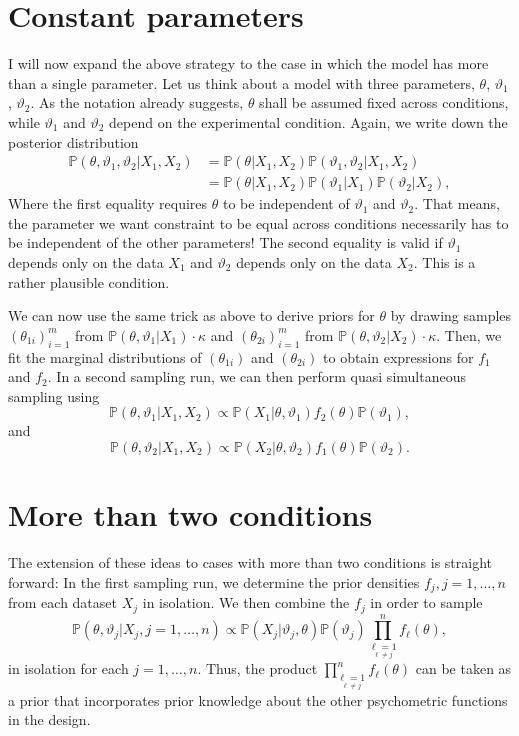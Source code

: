 \documentclass[a4paper,11pt]{scrartcl}
\def\prob{\mathbb{P}}
\begin{document}
\section{Constant parameters}

I will now expand the above strategy to the case in which the model has more than a single parameter.
Let us think about a model with three parameters, $\theta$, $\vartheta_1$, $\vartheta_2$.
As the notation already suggests,  $\theta$ shall be assumed fixed across conditions, while $\vartheta_1$ and $\vartheta_2$ depend on the
experimental condition.
Again, we write down the posterior distribution
%
\begin{align*}
\prob(\theta,\vartheta_1,\vartheta_2|X_1,X_2) &=\prob(\theta|X_1,X_2)\prob(\vartheta_1,\vartheta_2|X_1,X_2)\\
&= \prob(\theta|X_1,X_2)\prob(\vartheta_1|X_1)\prob(\vartheta_2|X_2),
\end{align*}
%
Where the first equality requires $\theta$ to be independent of $\vartheta_1$ and $\vartheta_2$.
That means, the parameter we want constraint to be equal across conditions necessarily has to be independent of the other parameters!
The second equality is valid if $\vartheta_1$ depends only on the data $X_1$ and $\vartheta_2$ depends only on the data $X_2$.
This is a rather plausible condition.

We can now use the same trick as above to derive priors for $\theta$ by drawing samples $(\theta_{1i})_{i=1}^m$ from $\prob(\theta,\vartheta_1|X_1)\cdot\kappa$
and $(\theta_{2i})_{i=1}^m$ from $\prob(\theta,\vartheta_2|X_2)\cdot\kappa$.
Then, we fit the marginal distributions of $(\theta_{1i})$ and $(\theta_{2i})$ to obtain expressions for $f_1$ and $f_2$.
In a second sampling run, we can then perform quasi simultaneous sampling using
%
$$
\prob(\theta,\vartheta_1|X_1,X_2) \propto\prob(X_1|\theta,\vartheta_1)f_2(\theta)\prob(\vartheta_1),
$$
%
and
%
$$
\prob(\theta,\vartheta_2|X_1,X_2) \propto\prob(X_2|\theta,\vartheta_2)f_1(\theta)\prob(\vartheta_2).
$$
%

\section{More than two conditions}

The extension of these ideas to cases with more than two conditions is straight forward:
In the first sampling run, we determine the prior densities $f_j, j=1,\dots,n$ from each dataset $X_j$ in isolation.
We then combine the $f_j$ in order to sample
%
\begin{equation}
    \label{eq:allcombined}
\prob(\theta,\vartheta_j|X_j, j=1,\dots,n) \propto\prob(X_j|\vartheta_j,\theta) \prob(\vartheta_j) \prod_{\underset{\ell\neq j}{\ell=1}}^n f_\ell ( \theta ),
\end{equation}
%
in isolation for each $j=1,\dots,n$.
Thus, the product $\prod_{\underset{\ell\neq j}{\ell=1}}^n f_\ell ( \theta )$ can be taken as a prior that incorporates prior knowledge about the other psychometric functions in the design.
\end{document}
